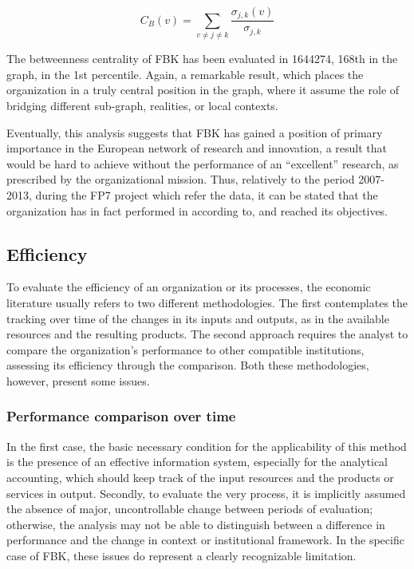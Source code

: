 \[
	C_B (v) =
		\sum_{v \neq j \neq k}
			\frac {\sigma_{j,k} (v)}{\sigma_{j,k}}
\]

The betweenness centrality of FBK has been evaluated in 1644274, 168th in the graph, in the 1st percentile. Again, a remarkable result, which places the organization in a truly central position in the graph, where it assume the role of bridging different sub-graph, realities, or local contexts. 

Eventually, this analysis suggests that FBK has gained a position of primary importance in the European network of research and innovation, a result that would be hard to achieve without the performance of an \enquote{excellent} research, as prescribed by the organizational mission. Thus, relatively to the period 2007-2013, during the FP7 project which refer the data, it can be stated that the organization has in fact performed in according to, and reached its objectives. 

\subsection{Efficiency}

To evaluate the efficiency of an organization or its processes, the economic literature usually refers to two different methodologies. The first contemplates the tracking over time of the changes in its inputs and outputs, as in the available resources and the resulting products. The second approach requires the analyst to compare the organization's performance to other compatible institutions, assessing its efficiency through the comparison. Both these methodologies, however, present some issues.

\subsubsection{Performance comparison over time}

In the first case, the basic necessary condition for the applicability of this method is the presence of an effective information system, especially for the analytical accounting, which should keep track of the input resources and the products or services in output. Secondly, to evaluate the very process, it is implicitly assumed the absence of major, uncontrollable change between periods of evaluation; otherwise, the analysis may not be able to distinguish between a difference in performance and the change in context or institutional framework. In the specific case of FBK, these issues do represent a clearly recognizable limitation. 


